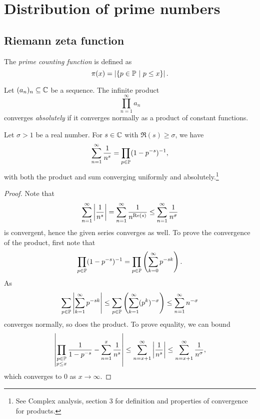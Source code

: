 \section{Distribution of prime numbers}

\subsection{Riemann zeta function}


\begin{definicija}
The \emph{prime counting function}
is defined as
\[
\pi(x) = \abs{\setb{p \in \P}{p \leq x}}.
\]
\end{definicija}

\begin{definicija}
Let $(a_n)_n \subseteq \C$ be a sequence. The infinite product
\[
\prod_{n=1}^\infty a_n
\]
converges \emph{absolutely} if it
converges normally as a product of constant functions.
\end{definicija}

\begin{izrek}
Let $\sigma > 1$ be a real number. For $s \in \C$ with
$\Re(s) \geq \sigma$, we have
\[
\sum_{n=1}^\infty \frac{1}{n^s} =
\prod_{p \in \P} (1 - p^{-s})^{-1},
\]
with both the product and sum converging uniformly and
absolutely.\footnote{See Complex analysis, section 3 for definition
and properties of convergence for products.}
\end{izrek}

\begin{proof}
Note that
\[
\sum_{n=1}^\infty \abs{\frac{1}{n^s}} =
\sum_{n=1}^\infty \frac{1}{n^{\Re(s)}} \leq
\sum_{n=1}^\infty \frac{1}{n^\sigma}
\]
is convergent, hence the given series converges as well. To prove
the convergence of the product, first note that
\[
\prod_{p \in \P} (1-p^{-s})^{-1} =
\prod_{p \in \P} \br{\sum_{k=0}^\infty p^{-sk}}.
\]
As
\[
\sum_{p \in \P} \abs{\sum_{k=1}^\infty p^{-sk}} \leq
\sum_{p \in \P} \br{\sum_{k=1}^\infty (p^k)^{-\sigma}} \leq
\sum_{n=1}^\infty n^{-\sigma}
\]
converges normally, so does the product. To prove equality, we can
bound
\[
\abs{\prod_{\substack{p \in \P \\ p \leq x}}
\frac{1}{1 - p^{-s}} - \sum_{n=1}^x \frac{1}{n^s}} \leq
\sum_{n=x+1}^\infty \abs{\frac{1}{n^s}} \leq
\sum_{n=x+1}^\infty \frac{1}{n^\sigma},
\]
which converges to $0$ as $x \to \infty$.
\end{proof}

